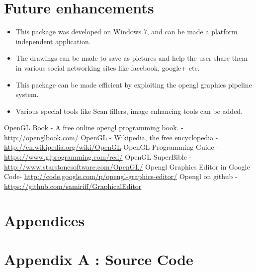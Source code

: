 \documentclass[12pt]{report}
\begin{document}
\section{Future enhancements}
\begin{itemize}
\item{} This package was developed on Windows 7, and can be made a platform independent application.
\item{}	The drawings can be made to save as pictures and help the user share them in various social networking sites like facebook, google+ etc.
\item{}	This package can be made efficient by exploiting the opengl graphics pipeline system.
\item{}Various special tools like Scan fillers, image enhancing tools can be added.

\end{itemize}

\newpage

\begin{thebibliography}{refs}
OpenGL Book - A free online opengl programming book.  -\url{http://openglbook.com/}
OpenGL - Wikipedia, the free encyclopedia - \url{http://en.wikipedia.org/wiki/OpenGL}
 OpenGL Programming Guide  - \url{https://www.glprogramming.com/red/}
OpenGL SuperBible - \url{http://www.starstonesoftware.com/OpenGL/}
 Opengl Graphics Editor in Google Code- \url{http://code.google.com/p/opengl-graphics-editor/}
Opengl on github - \url{https://github.com/samiriff/GraphicalEditor}

\end{thebibliography}

\newpage
\pagestyle{fancy}
\chead{}
\rfoot{\small{\thepage}}
\renewcommand{\headrulewidth}{0.4pt}
\renewcommand{\footrulewidth}{0.4pt}

\section*{Appendices}
\section*{Appendix A : Source Code}
\end{document}
